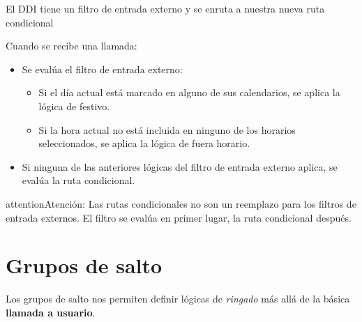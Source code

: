 \documentclass[letterpaper,10pt,spanish]{sphinxmanual}
\begin{document}
\noindent{}

El DDI tiene un filtro de entrada externo y se enruta a nuestra nueva ruta condicional

Cuando se recibe una llamada:
\begin{itemize}
\item {} 
Se evalúa el filtro de entrada externo:
\begin{itemize}
\item {} 
Si el día actual está marcado en alguno de sus calendarios, se aplica la lógica de festivo.

\item {} 
Si la hora actual no está incluida en ninguno de los horarios seleccionados, se aplica la lógica de fuera horario.

\end{itemize}

\item {} 
Si ninguna de las anteriores lógicas del filtro de entrada externo aplica, se evalúa la ruta condicional.

\end{itemize}

\begin{notice}{attention}{Atención:}
Las rutas condicionales no son un reemplazo para los filtros de entrada externos. El filtro se evalúa en primer lugar, la ruta condicional después.
\end{notice}


\section{Grupos de salto}
\label{pbx_features/huntgroups:hunt-groups}\label{pbx_features/huntgroups::doc}\label{pbx_features/huntgroups:huntgroups}
Los grupos de salto nos permiten definir lógicas de \emph{ringado} más allá de la básica \textbf{llamada a usuario}.
\end{document}
